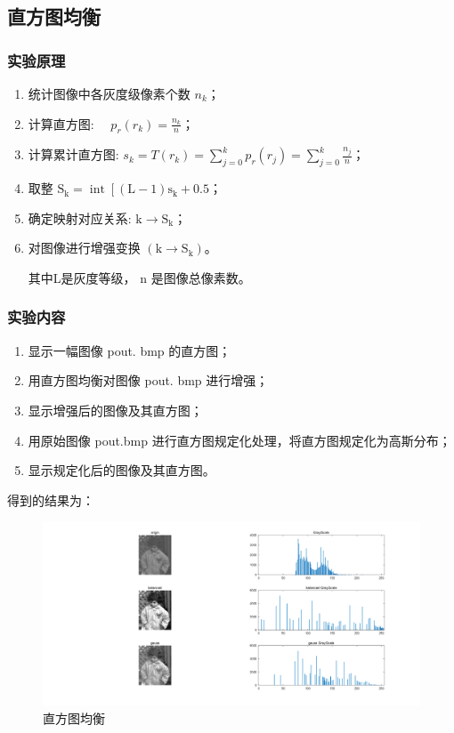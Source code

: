 \documentclass{ctexart}
\begin{document}
\subsection{\hei 直方图均衡}
\subsubsection{\hei 实验原理}
\begin{enumerate}
    \item 统计图像中各灰度级像素个数 $n_{k}$；
    \item 计算直方图: $\quad p_{r}\left(r_{k}\right)=\frac{n_{k}}{n}$；
    \item 计算累计直方图: $s_{k}=T\left(r_{k}\right)=\sum_{j=0}^{k} p_{r}\left(r_{j}\right)=\sum_{j=0}^{k} \frac{n_{j}}{n}$；
    \item 取整 $\mathrm{S}_{\mathrm{k}}=\operatorname{int}\left[(\mathrm{L}-1) \mathrm{s}_{\mathrm{k}}+\mathrm{0 . 5}\right.$；
    \item 确定映射对应关系: $\mathrm{k} \rightarrow \mathrm{S}_{\mathrm{k}}$；
    \item 对图像进行增强变换 $\left(\mathrm{k} \rightarrow \mathrm{S}_{\mathrm{k}}\right)$。\par
          其中L是灰度等级， $\mathrm{n}$ 是图像总像素数。
\end{enumerate}
\subsubsection{\hei 实验内容}
\begin{enumerate}
    \item 显示一幅图像 pout. bmp 的直方图；
    \item 用直方图均衡对图像 pout. bmp 进行增强；
    \item 显示增强后的图像及其直方图；
    \item 用原始图像 pout.bmp 进行直方图规定化处理，将直方图规定化为高斯分布；
    \item 显示规定化后的图像及其直方图。
\end{enumerate}
\par 得到的结果为：
\begin{figure}[H]
    \centering
    \includegraphics[scale=0.3]{2_4.png}
    \caption{直方图均衡}
\end{figure}
\end{document}
